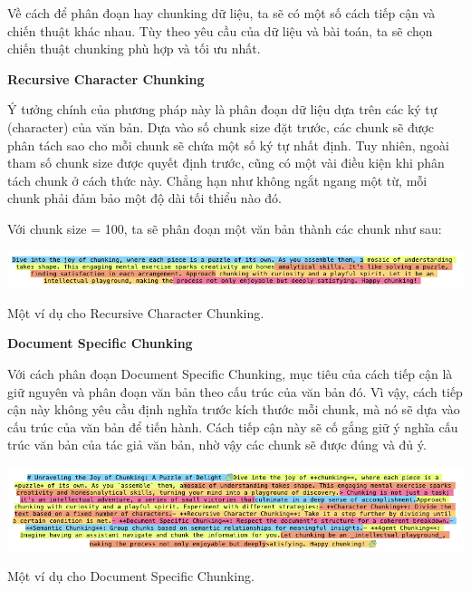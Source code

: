 \documentclass[a4paper, 12pt, openany]{book}
\begin{document}
Về cách để phân đoạn hay chunking dữ liệu, ta sẽ có một số cách tiếp cận và chiến thuật khác nhau.
Tùy theo yêu cầu của dữ liệu và bài toán, ta sẽ chọn chiến thuật chunking phù hợp và tối ưu nhất.

\textbf{Recursive Character Chunking}

Ý tưởng chính của phương pháp này là phân đoạn dữ liệu dựa trên các ký tự (character) của văn bản. Dựa vào số chunk size đặt trước, các 
chunk sẽ được phân tách sao cho mỗi chunk sẽ chứa một số ký tự nhất định. Tuy nhiên, ngoài tham số chunk size được quyết định trước, cũng có một vài
điều kiện khi phân tách chunk ở cách thức này. Chẳng hạn như không ngắt ngang một từ, mỗi chunk phải đảm bảo một độ dài tối thiểu nào đó.

Với chunk size = 100, ta sẽ phân đoạn một văn bản thành các chunk như sau:

\begin{minipage}{\linewidth}
    \centering
    \includegraphics[width=\linewidth]{./assets/images/recursive-chunkchunk.png}
    \captionsetup{type=figure}
    \caption{Một ví dụ cho Recursive Character Chunking.}
\end{minipage}

\vspace{0.5cm}

\textbf{Document Specific Chunking}

Với cách phân đoạn Document Specific Chunking, mục tiêu của cách tiếp cận là giữ nguyên và phân đoạn văn bản theo cấu trúc của văn bản đó.
Vì vậy, cách tiếp cận này không yêu cầu định nghĩa trước kích thước mỗi chunk, mà nó sẽ dựa vào cấu trúc của văn bản để tiến hành.
Cách tiếp cận này sẽ cố gắng giữ ý nghĩa cấu trúc văn bản của tác giả văn bản, nhờ vậy các chunk sẽ được đúng và đủ ý.

\begin{minipage}{\linewidth}
    \centering
    \includegraphics[width=\linewidth]{./assets/images/doc-specific-chunk.png}
    \captionsetup{type=figure}
    \caption{Một ví dụ cho Document Specific Chunking.}
\end{minipage}
\end{document}
